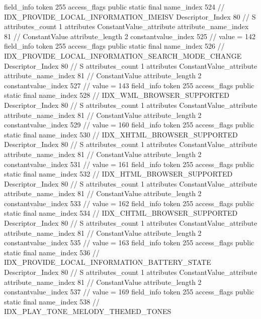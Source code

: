 {{{{{{{				}
				}
			}
			field_info {
				token	255
				access_flags	public static final
				name_index	524		// IDX_PROVIDE_LOCAL_INFORMATION_IMEISV
				Descriptor_Index	80		// S
				attributes_count	1
				attributes {
				ConstantValue_attribute {
					attribute_name_index	81		// ConstantValue
					attribute_length	2
					constantvalue_index	525		// value = 142
				}
				}
			}
			field_info {
				token	255
				access_flags	public static final
				name_index	526		// IDX_PROVIDE_LOCAL_INFORMATION_SEARCH_MODE_CHANGE
				Descriptor_Index	80		// S
				attributes_count	1
				attributes {
				ConstantValue_attribute {
					attribute_name_index	81		// ConstantValue
					attribute_length	2
					constantvalue_index	527		// value = 143
				}
				}
			}
			field_info {
				token	255
				access_flags	public static final
				name_index	528		// IDX_WML_BROWSER_SUPPORTED
				Descriptor_Index	80		// S
				attributes_count	1
				attributes {
				ConstantValue_attribute {
					attribute_name_index	81		// ConstantValue
					attribute_length	2
					constantvalue_index	529		// value = 160
				}
				}
			}
			field_info {
				token	255
				access_flags	public static final
				name_index	530		// IDX_XHTML_BROWSER_SUPPORTED
				Descriptor_Index	80		// S
				attributes_count	1
				attributes {
				ConstantValue_attribute {
					attribute_name_index	81		// ConstantValue
					attribute_length	2
					constantvalue_index	531		// value = 161
				}
				}
			}
			field_info {
				token	255
				access_flags	public static final
				name_index	532		// IDX_HTML_BROWSER_SUPPORTED
				Descriptor_Index	80		// S
				attributes_count	1
				attributes {
				ConstantValue_attribute {
					attribute_name_index	81		// ConstantValue
					attribute_length	2
					constantvalue_index	533		// value = 162
				}
				}
			}
			field_info {
				token	255
				access_flags	public static final
				name_index	534		// IDX_CHTML_BROWSER_SUPPORTED
				Descriptor_Index	80		// S
				attributes_count	1
				attributes {
				ConstantValue_attribute {
					attribute_name_index	81		// ConstantValue
					attribute_length	2
					constantvalue_index	535		// value = 163
				}
				}
			}
			field_info {
				token	255
				access_flags	public static final
				name_index	536		// IDX_PROVIDE_LOCAL_INFORMATION_BATTERY_STATE
				Descriptor_Index	80		// S
				attributes_count	1
				attributes {
				ConstantValue_attribute {
					attribute_name_index	81		// ConstantValue
					attribute_length	2
					constantvalue_index	537		// value = 169
				}
				}
			}
			field_info {
				token	255
				access_flags	public static final
				name_index	538		// IDX_PLAY_TONE_MELODY_THEMED_TONES
}}}}}
